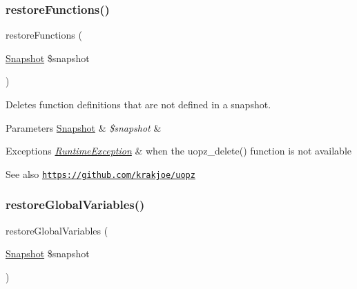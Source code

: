 \subsubsection{\texorpdfstring{restore\+Functions()}{restoreFunctions()}}
{\footnotesize\ttfamily restore\+Functions (\begin{DoxyParamCaption}\item[{\mbox{\hyperlink{class_sebastian_bergmann_1_1_global_state_1_1_snapshot}{Snapshot}}}]{\$snapshot }\end{DoxyParamCaption})}

Deletes function definitions that are not defined in a snapshot.


\begin{DoxyParams}[1]{Parameters}
\mbox{\hyperlink{class_sebastian_bergmann_1_1_global_state_1_1_snapshot}{Snapshot}} & {\em \$snapshot} & \\
\hline
\end{DoxyParams}

\begin{DoxyExceptions}{Exceptions}
{\em \mbox{\hyperlink{class_sebastian_bergmann_1_1_global_state_1_1_runtime_exception}{Runtime\+Exception}}} & when the uopz\+\_\+delete() function is not available \\
\hline
\end{DoxyExceptions}
\begin{DoxySeeAlso}{See also}
\href{https://github.com/krakjoe/uopz}{\tt https\+://github.\+com/krakjoe/uopz} 
\end{DoxySeeAlso}
\mbox{\label{class_sebastian_bergmann_1_1_global_state_1_1_restorer_a1adc1df008a579db8c01d4605d77d605}} 
\subsubsection{\texorpdfstring{restore\+Global\+Variables()}{restoreGlobalVariables()}}
{\footnotesize\ttfamily restore\+Global\+Variables (\begin{DoxyParamCaption}\item[{\mbox{\hyperlink{class_sebastian_bergmann_1_1_global_state_1_1_snapshot}{Snapshot}}}]{\$snapshot }\end{DoxyParamCaption})}

